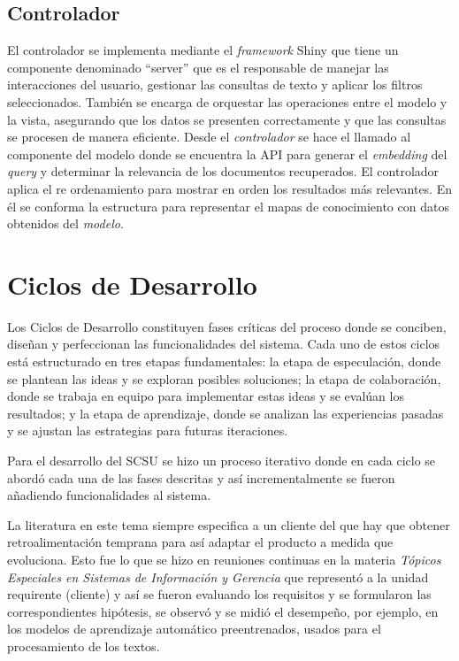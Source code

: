 \documentclass[
  12pt,
  openany]{book}
\begin{document}
\hypertarget{controlador}{%
\subsection{\texorpdfstring{\textbf{Controlador}}{Controlador}}\label{controlador}}

El controlador se implementa mediante el \emph{framework} Shiny que tiene un componente denominado ``server'' que es el responsable de manejar las interacciones del usuario, gestionar las consultas de texto y aplicar los filtros seleccionados. También se encarga de orquestar las operaciones entre el modelo y la vista, asegurando que los datos se presenten correctamente y que las consultas se procesen de manera eficiente. Desde el \emph{controlador} se hace el llamado al componente del modelo donde se encuentra la API para generar el \emph{embedding} del \emph{query} y determinar la relevancia de los documentos recuperados. El controlador aplica el re ordenamiento para mostrar en orden los resultados más relevantes. En él se conforma la estructura para representar el mapas de conocimiento con datos obtenidos del \emph{modelo}.

\hypertarget{desarrollociclos}{%
\section{Ciclos de Desarrollo}\label{desarrollociclos}}

Los Ciclos de Desarrollo constituyen fases críticas del proceso donde se conciben, diseñan y perfeccionan las funcionalidades del sistema. Cada uno de estos ciclos está estructurado en tres etapas fundamentales: la etapa de especulación, donde se plantean las ideas y se exploran posibles soluciones; la etapa de colaboración, donde se trabaja en equipo para implementar estas ideas y se evalúan los resultados; y la etapa de aprendizaje, donde se analizan las experiencias pasadas y se ajustan las estrategias para futuras iteraciones.

Para el desarrollo del SCSU se hizo un proceso iterativo donde en cada ciclo se abordó cada una de las fases descritas y así incrementalmente se fueron añadiendo funcionalidades al sistema.

La literatura en este tema siempre especifica a un cliente del que hay que obtener retroalimentación temprana para así adaptar el producto a medida que evoluciona. Esto fue lo que se hizo en reuniones continuas en la materia \emph{Tópicos Especiales en Sistemas de Información y Gerencia} que representó a la unidad requirente (cliente) y así se fueron evaluando los requisitos y se formularon las correspondientes hipótesis, se observó y se midió el desempeño, por ejemplo, en los modelos de aprendizaje automático preentrenados, usados para el procesamiento de los textos.
\end{document}
